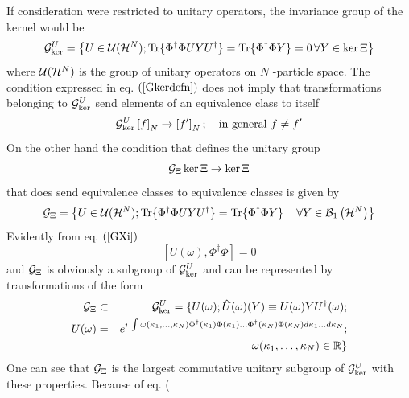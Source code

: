If consideration were restricted to unitary operators, the invariance group
of the kernel would be 
\begin{equation}
{\cal G}_{\ker }^{U}=\left\{ U\in {\cal U}({\cal H}^{N});{\rm Tr}\{\Phi
^{\dagger }\Phi UYU^{\dagger }\}={\rm Tr}\{\Phi ^{\dagger }\Phi
Y\}=0\,\forall Y\in \ker \Xi \right\}  \label{Gkerdefn}
\end{equation}%
where ${\cal U}({\cal H}^{N})$ is the group of unitary operators on $N$%
-particle space. The condition expressed in eq. $\left( \ref{Gkerdefn}%
\right) $ does not imply that transformations belonging to ${\cal G}_{\ker
}^{U}$ send elements of an equivalence class to itself 
\begin{equation}
{\cal G}_{\ker }^{U}\left[ f\right] _{N}\rightarrow \left[ f^{\prime }\right]
_{N};\quad \text{in general }f\neq f^{\prime }
\end{equation}%
On the other hand the condition that defines the unitary group 
\begin{equation}
{\cal G}_{\Xi }\ker \Xi \rightarrow \ker \Xi
\end{equation}%
that does send equivalence classes to equivalence classes is given by 
\begin{equation}
{\cal G}_{\Xi }=\left\{ U\in {\cal U}({\cal H}^{N});{\rm Tr}\{\Phi ^{\dagger
}\Phi UYU^{\dagger }\}={\rm Tr}\{\Phi ^{\dagger }\Phi Y\}\quad \,\forall
Y\in {\cal B}_{1}\left( {\cal H}^{N}\right) \right\}  \label{GXi}
\end{equation}%
Evidently from eq. $\left( \ref{GXi}\right) $ 
\begin{equation}
\left[ U(\omega ),\Phi ^{\dagger }\Phi \right] =0
\end{equation}%
and ${\cal G}_{\Xi }$ is obviously a subgroup of ${\cal G}_{\ker }^{U}$ and
can be represented by transformations of the form 
\begin{eqnarray}
{\cal G}_{\Xi } &\subset &{\cal G}_{\ker }^{U}=\{U(\omega );\hat{U}(\omega
)(Y)\equiv U(\omega )YU^{\dagger }(\omega );  \nonumber \\
U(\omega ) &=&e^{i\,\int \omega (\kappa _{1},\ldots ,\kappa _{N})\Phi
^{\dagger }(\kappa _{1})\Phi (\kappa _{1})\ldots \Phi ^{\dagger }(\kappa
_{N})\Phi (\kappa _{N})d\kappa _{1}\ldots d\kappa _{N}};  \nonumber \\
&&\qquad \qquad \qquad \qquad \quad \omega (\kappa _{1},\ldots ,\kappa
_{N})\in {\Bbb R}\}  \label{GXidefn}
\end{eqnarray}%
One can see that ${\cal G}_{\Xi }$ is the largest commutative unitary
subgroup of ${\cal G}_{\ker }^{U}$ with these properties. Because of eq. (%
